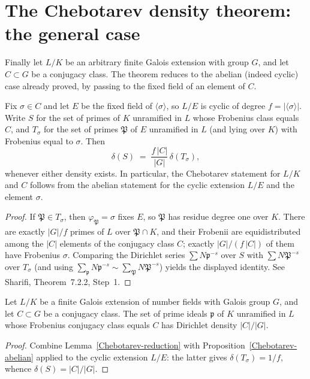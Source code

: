 {\section{The Chebotarev density theorem: the general case}

Finally let $L/K$ be an arbitrary finite Galois extension with group $G$, and let $C\subset G$
be a conjugacy class.  The theorem reduces to the abelian (indeed cyclic) case already proved,
by passing to the fixed field of an element of $C$.

\begin{lemma}\label{Chebotarev-reduction}
Fix $\sigma\in C$ and let $E$ be the fixed field of $\langle\sigma\rangle$, so $L/E$ is cyclic of
degree $f = |\langle\sigma\rangle|$.  Write $S$ for the set of primes of $K$ unramified in $L$
whose Frobenius class equals $C$, and $T_\sigma$ for the set of primes $\mathfrak{P}$ of $E$
unramified in $L$ (and lying over $K$) with Frobenius equal to $\sigma$.  Then
\[
\delta(S) \;=\; \frac{f\,|C|}{|G|}\,\delta(T_\sigma),
\]
whenever either density exists.  In particular, the Chebotarev statement for $L/K$ and $C$
follows from the abelian statement for the cyclic extension $L/E$ and the element $\sigma$.
\end{lemma}

\begin{proof}
If $\mathfrak{P}\in T_\sigma$, then $\varphi_{\mathfrak{P}}=\sigma$ fixes $E$, so $\mathfrak{P}$ has
residue degree one over $K$.  There are exactly $|G|/f$ primes of $L$ over $\mathfrak{P}\cap K$,
and their Frobenii are equidistributed among the $|C|$ elements of the conjugacy class $C$;
exactly $|G|/(f\,|C|)$ of them have Frobenius $\sigma$.  Comparing the Dirichlet series
$\sum N\mathfrak{p}^{-s}$ over $S$ with $\sum N\mathfrak{P}^{-s}$ over $T_\sigma$ (and using
$\sum_{\mathfrak{p}} N\mathfrak{p}^{-s} \sim \sum_{\mathfrak{P}} N\mathfrak{P}^{-s}$) yields the
displayed identity.  See Sharifi, Theorem~7.2.2, Step~1.
\end{proof}

\begin{theorem}\label{Chebotarev-general}
Let $L/K$ be a finite Galois extension of number fields with Galois group $G$, and let
$C\subset G$ be a conjugacy class.  The set of prime ideals $\mathfrak{p}$ of $K$ unramified in
$L$ whose Frobenius conjugacy class equals $C$ has Dirichlet density $|C|/|G|$.
\end{theorem}

\begin{proof}
Combine Lemma~\ref{Chebotarev-reduction} with Proposition~\ref{Chebotarev-abelian} applied to
the cyclic extension $L/E$: the latter gives $\delta(T_\sigma) = 1/f$, whence
$\delta(S) = |C|/|G|$.
\end{proof}
}